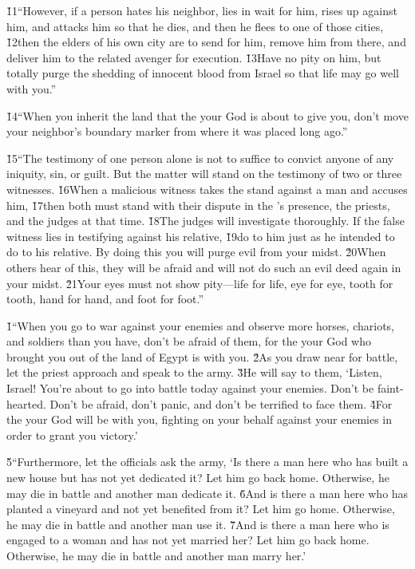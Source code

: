 \v{11}``However, if a person hates his neighbor, lies in wait for him, rises up against him, and attacks him so that he dies, and then he flees to one of those cities, \v{12}then the elders of his own city are to send for him, remove him from there, and deliver him to the related avenger for execution. \v{13}Have no pity on him, but totally purge the shedding of innocent blood from Israel so that life may go well with you.''

\v{14}``When you inherit the land that the  your God is about to give you, don't move your neighbor's boundary marker from where it was placed long ago.''

\v{15}``The testimony of one person alone is not to suffice to convict anyone of any iniquity, sin, or guilt. But the matter will stand on the testimony of two or three witnesses. \v{16}When a malicious witness takes the stand against a man and accuses him, \v{17}then both must stand with their dispute in the 's presence, the priests, and the judges at that time. \v{18}The judges will investigate thoroughly. If the false witness lies in testifying against his relative, \v{19}do to him just as he intended to do to his relative. By doing this you will purge evil from your midst. \v{20}When others hear of this, they will be afraid and will not do such an evil deed again in your midst. \v{21}Your eyes must not show pity---life for life, eye for eye, tooth for tooth, hand for hand, and foot for foot.''

\v{1}``When you go to war against your enemies and observe more horses, chariots, and soldiers than you have, don't be afraid of them, for the  your God who brought you out of the land of Egypt is with you. \v{2}As you draw near for battle, let the priest approach and speak to the army. \v{3}He will say to them, `Listen, Israel! You're about to go into battle today against your enemies. Don't be faint-hearted. Don't be afraid, don't panic, and don't be terrified to face them. \v{4}For the  your God will be with you, fighting on your behalf against your enemies in order to grant you victory.'

\v{5}``Furthermore, let the officials ask the army, `Is there a man here who has built a new house but has not yet dedicated it? Let him go back home. Otherwise, he may die in battle and another man dedicate it. \v{6}And is there a man here who has planted a vineyard and not yet benefited from it? Let him go home. Otherwise, he may die in battle and another man use it. \v{7}And is there a man here who is engaged to a woman and has not yet married her? Let him go back home. Otherwise, he may die in battle and another man marry her.'

